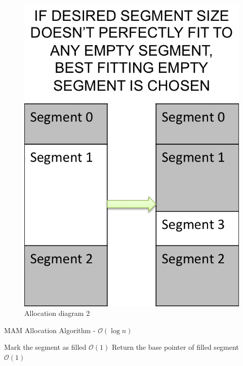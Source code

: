 \documentclass[conference]{IEEEtran}
\begin{document}
\begin{figure}[!hbp]
\begin{minipage}[b]{0.20\textwidth}
    \includegraphics[width=\linewidth]{allocation/allocation2.png}
  	\caption{Allocation diagram 2}
  	\label{fig:alloc2}
  \end{minipage}
\end{figure}

\begin{algorithm}                                                                                                  
\caption{MAM Allocation Algorithm - $\mathcal{O}(\log n)$}                                                                     
\label{algorithm}                                                                                      
\begin{algorithmic}[1] 
\State Mark the segment as filled $\mathcal{O}(1)$
\Else
\EndIf
\State Return the base pointer of filled segment $\mathcal{O}(1)$
\EndProcedure
\end{algorithmic} 
\end{algorithm}
\end{document}
